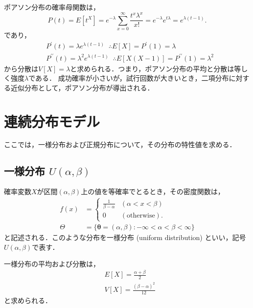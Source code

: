 \documentclass{jsreport}
\begin{document}
ポアソン分布の確率母関数は，
\begin{equation}
  P(t) = E[t^X] = e^{-\lambda} \sum_{x = 0}^{\infty} \frac{t^x \lambda^x}{x!} = e^{-\lambda}e^{t\lambda} = e^{\lambda(t - 1)}. \nonumber
\end{equation}
であり，
\begin{align}
  &P^{\prime}(t) = \lambda e^{\lambda(t - 1)} \; \; \therefore E[X] = P^{\prime}(1) = \lambda \nonumber \\
  &P^{\prime \prime}(t) = \lambda^2 e^{\lambda(t - 1)} \; \; \therefore E[X(X - 1)] = P^{\prime \prime}(1) = \lambda^2 \nonumber
\end{align}
から分散は$V[X] = \lambda$と求められる．つまり，ポアソン分布の平均と分散は等しく強度$\lambda$である．
成功確率が小さいが，試行回数が大きいとき，二項分布に対する近似分布として，ポアソン分布が導出される．

\section{連続分布モデル}
ここでは，一様分布および正規分布について，その分布の特性値を求める．
\subsection{一様分布 $U(\alpha, \beta)$}
確率変数$X$が区間$(\alpha, \beta)$上の値を等確率でとるとき，その密度関数は，
\begin{align}
  f(x) &= \begin{cases}
    \frac{1}{\beta - \alpha} & (\alpha < x < \beta) \\
    0 & (\mbox{otherwise}).
\end{cases}\nonumber \\
\Theta &= \{\bm{\theta} = (\alpha, \beta) : -\infty < \alpha < \beta < \infty\} \nonumber
\end{align}
と記述される．このような分布を一様分布 (uniform distribution) といい，記号$U(\alpha, \beta)$で表す．

一様分布の平均および分散は，
\begin{align}
  &E[X] = \frac{\alpha + \beta}{2} \nonumber \\
  &V[X] = \frac{(\beta - \alpha)^2}{12} \nonumber
\end{align}
と求められる．
\end{document}
